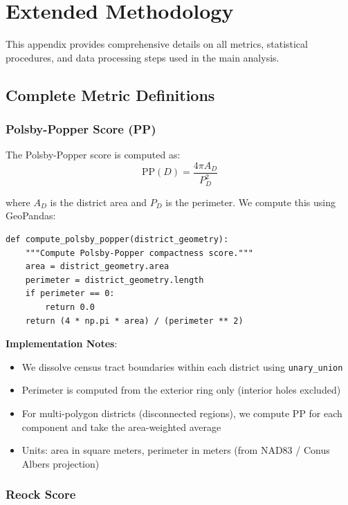 
\section{Extended Methodology}
\label{appendix:methodology}

This appendix provides comprehensive details on all metrics, statistical procedures, and data processing steps used in the main analysis.

\subsection{Complete Metric Definitions}

\subsubsection{Polsby-Popper Score (PP)}

The Polsby-Popper score is computed as:
\[
\text{PP}(D) = \frac{4\pi A_D}{P_D^2}
\]

where $A_D$ is the district area and $P_D$ is the perimeter. We compute this using GeoPandas:

\begin{verbatim}
def compute_polsby_popper(district_geometry):
    """Compute Polsby-Popper compactness score."""
    area = district_geometry.area
    perimeter = district_geometry.length
    if perimeter == 0:
        return 0.0
    return (4 * np.pi * area) / (perimeter ** 2)
\end{verbatim}

\textbf{Implementation Notes}:
\begin{itemize}
    \item We dissolve census tract boundaries within each district using \texttt{unary\_union}
    \item Perimeter is computed from the exterior ring only (interior holes excluded)
    \item For multi-polygon districts (disconnected regions), we compute PP for each component and take the area-weighted average
    \item Units: area in square meters, perimeter in meters (from NAD83 / Conus Albers projection)
\end{itemize}

\subsubsection{Reock Score}

